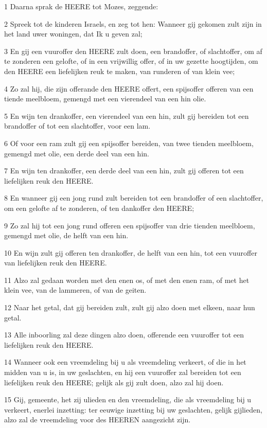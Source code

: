 \par 1 Daarna sprak de HEERE tot Mozes, zeggende:
\par 2 Spreek tot de kinderen Israels, en zeg tot hen: Wanneer gij gekomen zult zijn in het land uwer woningen, dat Ik u geven zal;
\par 3 En gij een vuuroffer den HEERE zult doen, een brandoffer, of slachtoffer, om af te zonderen een gelofte, of in een vrijwillig offer, of in uw gezette hoogtijden, om den HEERE een liefelijken reuk te maken, van runderen of van klein vee;
\par 4 Zo zal hij, die zijn offerande den HEERE offert, een spijsoffer offeren van een tiende meelbloem, gemengd met een vierendeel van een hin olie.
\par 5 En wijn ten drankoffer, een vierendeel van een hin, zult gij bereiden tot een brandoffer of tot een slachtoffer, voor een lam.
\par 6 Of voor een ram zult gij een spijsoffer bereiden, van twee tienden meelbloem, gemengd met olie, een derde deel van een hin.
\par 7 En wijn ten drankoffer, een derde deel van een hin, zult gij offeren tot een liefelijken reuk den HEERE.
\par 8 En wanneer gij een jong rund zult bereiden tot een brandoffer of een slachtoffer, om een gelofte af te zonderen, of ten dankoffer den HEERE;
\par 9 Zo zal hij tot een jong rund offeren een spijsoffer van drie tienden meelbloem, gemengd met olie, de helft van een hin.
\par 10 En wijn zult gij offeren ten drankoffer, de helft van een hin, tot een vuuroffer van liefelijken reuk den HEERE.
\par 11 Alzo zal gedaan worden met den enen os, of met den enen ram, of met het klein vee, van de lammeren, of van de geiten.
\par 12 Naar het getal, dat gij bereiden zult, zult gij alzo doen met elkeen, naar hun getal.
\par 13 Alle inboorling zal deze dingen alzo doen, offerende een vuuroffer tot een liefelijken reuk den HEERE.
\par 14 Wanneer ook een vreemdeling bij u als vreemdeling verkeert, of die in het midden van u is, in uw geslachten, en hij een vuuroffer zal bereiden tot een liefelijken reuk den HEERE; gelijk als gij zult doen, alzo zal hij doen.
\par 15 Gij, gemeente, het zij ulieden en den vreemdeling, die als vreemdeling bij u verkeert, enerlei inzetting: ter eeuwige inzetting bij uw geslachten, gelijk gijlieden, alzo zal de vreemdeling voor des HEEREN aangezicht zijn.
